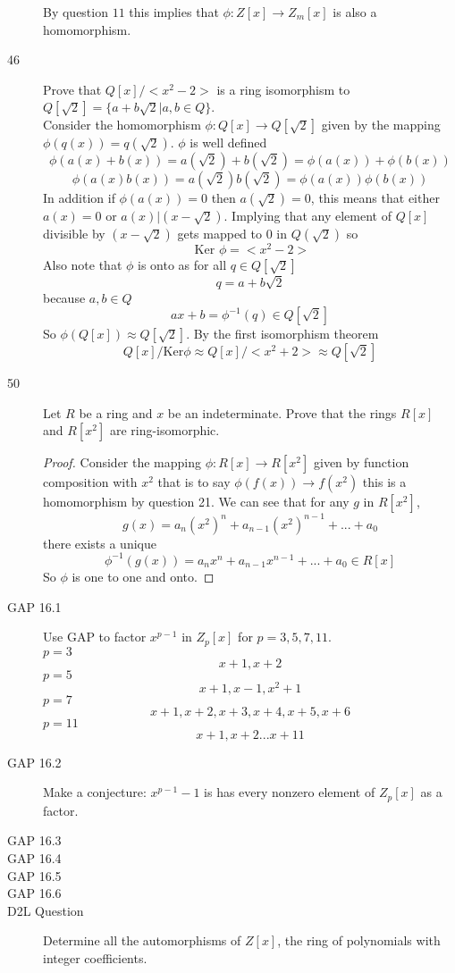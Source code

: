 \documentclass[11pt]{article}
\begin{document}
\begin{description}
		By question $11$ this implies that $\phi : Z[x] \rightarrow
		Z_m[x]$ is also a homomorphism.
	\item[46]
		Prove that $Q[x]/<x^2 -2>$ is a ring isomorphism to $Q[\sqrt2]
		= \{a + b\sqrt2 | a,b \in Q \}$. \\
		Consider the homomorphism $\phi : Q[x] \rightarrow Q[\sqrt2]$
		given by the mapping $\phi(q(x)) = q(\sqrt2)$. $\phi$ is well
		defined
		$$\phi(a(x) + b(x)) = a(\sqrt2) + b(\sqrt2) = \phi(a(x)) +
		\phi(b(x))$$
		$$\phi(a(x)b(x)) = a(\sqrt2)b(\sqrt2) = \phi(a(x))\phi(b(x))$$
		In addition if $\phi(a(x)) = 0$ then $a(\sqrt2) = 0$, this means
		that either $a(x) = 0$ or $a(x) | (x - \sqrt2)$.
		Implying that any element of $Q[x]$ divisible by $(x-\sqrt2)$
		gets mapped to $0$ in $Q(\sqrt2)$ so 
		$$\text{ Ker } \phi = <x^2-2>$$
		Also note that $\phi$ is onto as for all $ q \in Q[\sqrt2]$
			$$  q = a + b\sqrt2 $$
		because $a,b \in Q$
			$$ ax+b =  \phi^{-1}(q) \in Q[\sqrt2] $$
		So $\phi(Q[x]) \approx  Q[\sqrt2] $. By the first isomorphism
		theorem 
		$$ Q[x]/\text{Ker}\phi \approx Q[x]/<x^2+2> \approx Q[\sqrt2] $$
	\item[50]
		Let $R$ be a ring and $x$ be an indeterminate. Prove that the
		rings $R[x]$ and $R[x^2]$ are ring-isomorphic.
		\begin{proof}
		Consider the mapping $\phi: R[x] \rightarrow R[x^2]$ given by
			function composition with $x^2$ that is to say
		$\phi(f(x)) \rightarrow f(x^2)$  this is a homomorphism
		by question 21. 
		We can see that for any $g$ in $R[x^2]$, 
		$$g(x) = a_n(x^{2})^n + a_{n-1}(x^{2})^{n-1} + ... + a_0$$
		there exists a unique
		$$\phi^{-1}(g(x)) = a_nx^n + a_{n-1}x^{n-1} + ... + a_0 \in R[x]$$
		So $\phi$ is one to one and onto.
		\end{proof}
	\item[GAP 16.1]
		Use GAP to factor $x^{p-1}$ in $Z_p[x]$ for $p = 3,5,7,11$.\\
		$p = 3$
			$$x+1, x+2$$
		$p = 5$
			$$x+1, x-1, x^2 +1$$
		$p = 7$
			$$x+1, x+2, x+3, x+4, x+5, x+6$$
		$p = 11$
			$$x+1, x+2 ... x+11$$
	\item[GAP 16.2]
		Make a conjecture:
		$x^{p-1}-1$ is has every nonzero element of $Z_p[x]$ as a
		factor.
	\item[GAP 16.3]
	\item[GAP 16.4]
	\item[GAP 16.5]
	\item[GAP 16.6]
	\item[D2L Question] Determine all the automorphisms of $Z[x]$, the ring of polynomials 
with integer coefficients.

\end{description}
\end{document}
